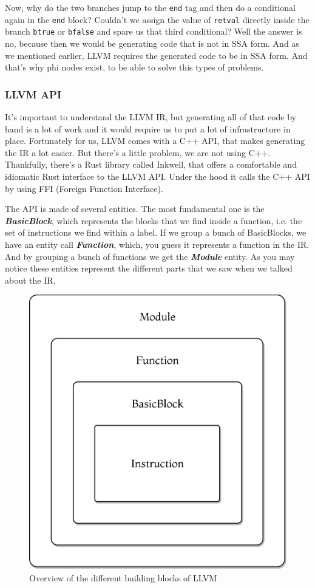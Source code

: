 ﻿\documentclass[10pt,a4paper,twocolumn,twoside]{article}
\begin{document}
Now, why do the two branches jump to the \texttt{end} tag and then do a
conditional again in the \texttt{end} block? Couldn't we assign the value of
\texttt{retval} directly inside the branch \texttt{btrue} or \texttt{bfalse} and
spare us that third conditional? Well the answer is no, because then we would be
generating code that is not in SSA form. And as we mentioned earlier, LLVM
requires the generated code to be in SSA form. And that's why phi nodes exist,
to be able to solve this types of problems.

\subsubsection{LLVM API}

It's important to understand the LLVM IR, but generating all of that code by
hand is a lot of work and it would require us to put a lot of infrastructure in
place. Fortunately for us, LLVM comes with a C++ API, that makes generating the
IR a lot easier. But there's a little problem, we are not using C++. Thankfully,
there's a Rust library called Inkwell\cite{inkwell}, that offers a comfortable
and idiomatic Rust interface to the LLVM API. Under the hood it calls the C++
API by using FFI (Foreign Function Interface).

The API is made of several entities. The most fundamental one is the
\textbf{\textit{BasicBlock}}, which represents the blocks that we find inside a
function, i.e. the set of instructions we find within a label. If we group a
bunch of BasicBlocks, we have an entity call \textbf{\textit{Function}}, which,
you guess it represents a function in the IR. And by grouping a bunch of
functions we get the \textbf{\textit{Module}} entity. As you may notice these
entities represent the different parts that we saw when we talked about the IR.

\begin{figure}[ht]
\centering
\captionsetup{justification=centering,margin=1cm}
\includegraphics[width=0.75\linewidth]{llvm-blocks}
\caption{Overview of the different building blocks of LLVM}
\end{figure}
\end{document}
